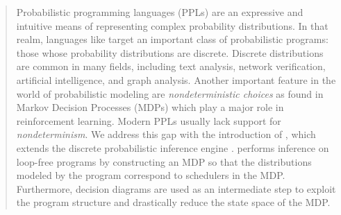 
\begin{abstract}

Probabilistic programming languages (PPLs) are an expressive and intuitive means of representing complex probability distributions. 
In that realm, languages like \DICE target an important class of probabilistic programs: those whose probability distributions are discrete.
Discrete distributions are common in many fields, including text analysis, network verification, artificial intelligence, and graph analysis.
Another important feature in the world of probabilistic modeling are \emph{nondeterministic choices} as found in Markov Decision Processes (MDPs) which play a major role in reinforcement learning.
Modern PPLs usually lack support for \emph{nondeterminism}.
We address this gap with the introduction of \NDICE, which extends the discrete probabilistic inference engine \DICE.
\NDICE performs inference on loop-free programs by constructing an MDP so that the distributions modeled by the program correspond to  schedulers in the MDP.
Furthermore, decision diagrams are used as an intermediate step to exploit the program structure and drastically reduce the state space of the MDP.
\end{abstract}
